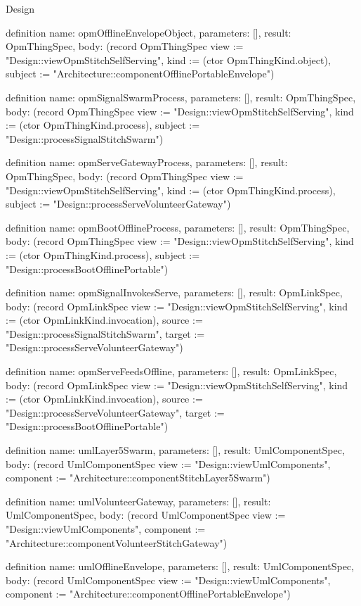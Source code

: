 \begin{lexlean}{Design}
\begin{semanticmodule}
definition{
  name: opmOfflineEnvelopeObject,
  parameters: [],
  result: OpmThingSpec,
  body: (record OpmThingSpec {view := "Design::viewOpmStitchSelfServing", kind := (ctor OpmThingKind.object), subject := "Architecture::componentOfflinePortableEnvelope"})
}

definition{
  name: opmSignalSwarmProcess,
  parameters: [],
  result: OpmThingSpec,
  body: (record OpmThingSpec {view := "Design::viewOpmStitchSelfServing", kind := (ctor OpmThingKind.process), subject := "Design::processSignalStitchSwarm"})
}

definition{
  name: opmServeGatewayProcess,
  parameters: [],
  result: OpmThingSpec,
  body: (record OpmThingSpec {view := "Design::viewOpmStitchSelfServing", kind := (ctor OpmThingKind.process), subject := "Design::processServeVolunteerGateway"})
}

definition{
  name: opmBootOfflineProcess,
  parameters: [],
  result: OpmThingSpec,
  body: (record OpmThingSpec {view := "Design::viewOpmStitchSelfServing", kind := (ctor OpmThingKind.process), subject := "Design::processBootOfflinePortable"})
}

definition{
  name: opmSignalInvokesServe,
  parameters: [],
  result: OpmLinkSpec,
  body: (record OpmLinkSpec {view := "Design::viewOpmStitchSelfServing", kind := (ctor OpmLinkKind.invocation), source := "Design::processSignalStitchSwarm", target := "Design::processServeVolunteerGateway"})
}

definition{
  name: opmServeFeedsOffline,
  parameters: [],
  result: OpmLinkSpec,
  body: (record OpmLinkSpec {view := "Design::viewOpmStitchSelfServing", kind := (ctor OpmLinkKind.invocation), source := "Design::processServeVolunteerGateway", target := "Design::processBootOfflinePortable"})
}

definition{
  name: umlLayer5Swarm,
  parameters: [],
  result: UmlComponentSpec,
  body: (record UmlComponentSpec {view := "Design::viewUmlComponents", component := "Architecture::componentStitchLayer5Swarm"})
}

definition{
  name: umlVolunteerGateway,
  parameters: [],
  result: UmlComponentSpec,
  body: (record UmlComponentSpec {view := "Design::viewUmlComponents", component := "Architecture::componentVolunteerStitchGateway"})
}

definition{
  name: umlOfflineEnvelope,
  parameters: [],
  result: UmlComponentSpec,
  body: (record UmlComponentSpec {view := "Design::viewUmlComponents", component := "Architecture::componentOfflinePortableEnvelope"})
}


\end{semanticmodule}
\end{lexlean}
